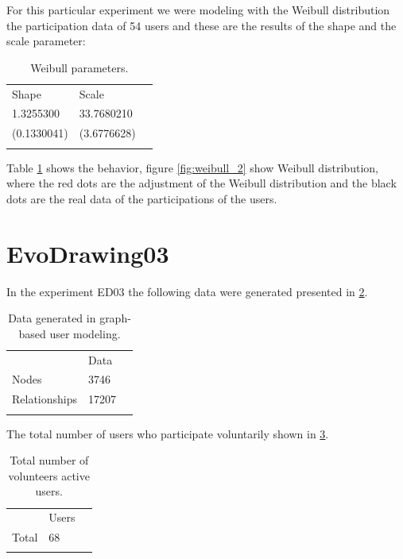 For this particular experiment we were modeling with the Weibull distribution
\cite{weibull1951wide} the participation data of 54 users and these are the
results of the shape and the scale parameter:

\begin{table}
\small
\caption{Weibull parameters.}
\label{tab:weibullp_2}
\centering
\small
\begin{tabular}{p{3cm} p{3cm} p{3cm} }
\hline\noalign{\smallskip}
Shape  & Scale &  \\
\noalign{\smallskip}\hline\noalign{\smallskip}
\small{1.3255300} & \small{33.7680210} & \\ \hline
\small{(0.1330041)} & \small{(3.6776628)} & \\ \hline

\noalign{\smallskip}\hline
\end{tabular}
\end{table}

Table \ref{tab:weibullp_2} shows the behavior, figure
\ref{fig:weibull_2} show Weibull distribution, where the red dots are the adjustment of the Weibull
distribution and the black dots are the real data of the participations of the
users.




\section{EvoDrawing03}
In the experiment ED03 the following data were
generated presented in \ref{tab:dataGenerated_3}.

\begin{table}
\small
\caption{Data generated in graph-based user modeling.}
\label{tab:dataGenerated_3}
\centering
\small
\begin{tabular}{p{3cm} p{3cm} p{3cm} }
\hline\noalign{\smallskip}
  & Data &  \\
\noalign{\smallskip}\hline\noalign{\smallskip}
\small{Nodes} & \small{3746 } & \\ \hline
\small{Relationships} & \small{17207 } & \\ \hline

\noalign{\smallskip}\hline
\end{tabular}
\end{table}

The total number of users who participate voluntarily shown in \ref{tab:totalUsers_3}.

\begin{table}
\small
\caption{Total number of volunteers active users.}
\label{tab:totalUsers_3}
\centering
\small
\begin{tabular}{p{3cm} p{3cm} p{3cm} }
\hline\noalign{\smallskip}
  & Users &  \\
\noalign{\smallskip}\hline\noalign{\smallskip}
\small{Total } & \small{68} & \\ \hline
\noalign{\smallskip}\hline
\end{tabular}
\end{table}

